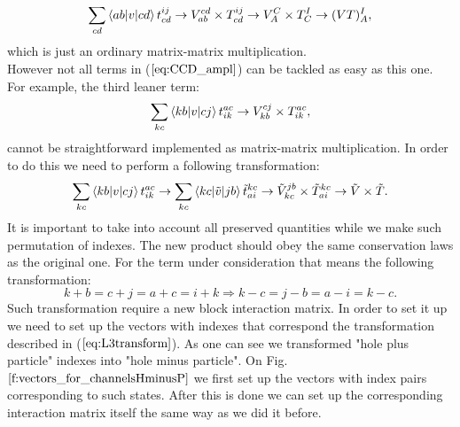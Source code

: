 \documentclass[twoside,english]{uiofysmaster}
\theoremstyle{definition}
\begin{document}
\begin{equation}
\sum_{cd}\braket{ab|v|cd}t_{cd}^{ij} \rightarrow V_{ab}^{cd} \times T_{cd}^{ij} \rightarrow V_{A}^{C} \times T_{C}^{I} \rightarrow (VT)_{A}^{I},
\end{equation}
which is just an ordinary matrix-matrix multiplication.\\
However not all terms in  ($\ref{eq:CCD_ampl}$) can be tackled as easy as this one. For example, the third leaner term:
\begin{align}
\sum_{kc}\braket{kb|v|cj}t_{ik}^{ac} \rightarrow V_{kb}^{cj} \times T_{ik}^{ac},
\end{align}
cannot be straightforward implemented as matrix-matrix multiplication. In order to do this we need to perform a following transformation:
\begin{align}
\sum_{kc}\braket{kb|v|cj}t_{ik}^{ac} \rightarrow \sum_{kc}\braket{kc|\tilde{v}|jb}\tilde{t}_{ai}^{kc} \rightarrow \tilde{V}_{kc}^{jb}\times \tilde{T}_{ai}^{kc} \rightarrow \tilde{V}\times\tilde{T}.
\end{align}
It is important to take into account all preserved quantities while we make such permutation of indexes. The new product should obey the same conservation laws as the original one. For the term under consideration that means the following transformation:
\begin{equation}\label{eq:L3transform}
k+b=c+j=a+c=i+k \Rightarrow k-c=j -b=a-i=k-c.
\end{equation}
Such transformation require a new block interaction matrix. In order to set it up we need to set up the vectors with indexes that correspond the transformation described in ($\ref{eq:L3transform}$). As one can see we transformed "hole plus particle" indexes into "hole minus particle". On Fig. $\ref{f:vectors_for_channelsHminusP}$ we first set up the vectors with index pairs corresponding to such states. After this is done we can set up the corresponding interaction matrix itself the same way as we did it before. 
\end{document}

